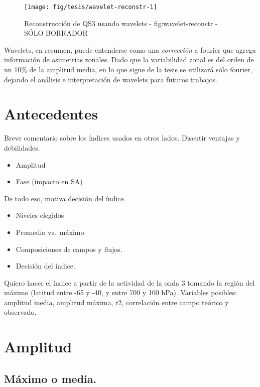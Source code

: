 \documentclass[spanish,a4paper]{book}
\providecommand{\tightlist}{%
  \setlength{\itemsep}{0pt}\setlength{\parskip}{0pt}}
\begin{document}
\begin{figure}
\texttt{[image: fig/tesis/wavelet-reconstr-1]} \caption{Reconstrucción de QS3 usando wavelets - fig:wavelet-reconstr - SÓLO BORRADOR}\label{fig:wavelet-reconstr}
\end{figure}

Wavelets, en resumen, puede entenderse como una \emph{corrección} a
fourier que agrega información de asimetrías zonales. Dado que la
variabilidad zonal es del orden de un 10\% de la amplitud media, en lo
que sigue de la tesis se utilizará sólo fourier, dejando el análisis e
interpretación de wavelets para futuros trabajos.

\section{Antecedentes}\label{antecedentes}

Breve comentario sobre los índices usados en otros lados. Discutir
ventajas y debilidades.

\begin{itemize}
\tightlist
\item
  Amplitud
\item
  Fase (impacto en SA)
\end{itemize}

De todo eso, motiva decisión del índice.

\begin{itemize}
\tightlist
\item
  Niveles elegidos
\item
  Promedio vs.~máximo
\item
  Composiciones de campos y flujos.
\item
  Decisión del índice.
\end{itemize}

Quiero hacer el índice a partir de la actividad de la onda 3 tomando la
región del máximo (latitud entre -65 y -40, y entre 700 y 100 hPa).
Variables posibles: amplitud media, amplitud máxima, r2, correlación
entre campo teórico y observado.

\section{Amplitud}\label{amplitud}

\subsection{Máximo o media.}\label{maximo-o-media.}
\end{document}
